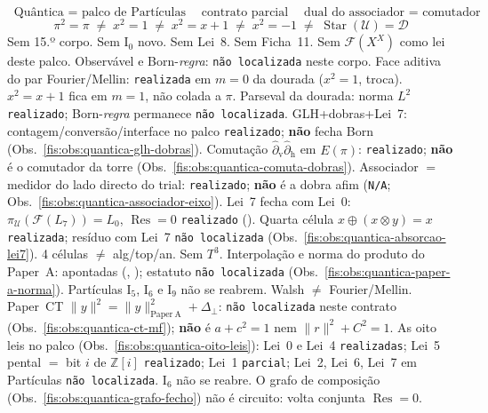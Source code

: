 \documentclass[livro.tex]{subfiles}
\begin{document}
\[
\boxed{\;
\text{Quântica $=$ palco de Partículas}
\quad
\text{contrato parcial}
\quad
\text{dual do associador $=$ comutador}
\;}
\]
\[
\boxed{\;
\pi^{2}=\pi
\;\neq\;
x^{2}=1
\;\neq\;
x^{2}=x+1
\;\neq\;
x^{2}=-1
\;\neq\;
\operatorname{Star}(\mathcal{U})=\mathcal{D}
\;}
\]
Sem 15.º corpo. Sem \(\mathrm{I}_{0}\) novo. Sem Lei~8. Sem Ficha~11.
Sem \(\mathcal{F}(X^{X})\) como lei deste palco. Observável e
Born-\emph{regra}: \texttt{não localizada} neste corpo.
Face aditiva do par Fourier/Mellin: \texttt{realizada} em
\(m=0\) da dourada (\(x^{2}=1\), troca).
\(x^{2}=x+1\) fica em \(m=1\), não colada a \(\pi\).
Parseval da dourada: norma \(L^{2}\) \texttt{realizado};
Born-\emph{regra} permanece \texttt{não localizada}.
GLH+dobras+Lei~7: contagem/conversão/interface no palco
\texttt{realizado}; \textbf{não} fecha Born
(Obs.~\ref{fis:obs:quantica-glh-dobras}).
Comutação
\(\hat\partial_{\mathrm{v}}\hat\partial_{\mathrm{h}}\)
em \(E(\pi)\): \texttt{realizado};
\textbf{não} é o comutador da torre
(Obs.~\ref{fis:obs:quantica-comuta-dobras}).
Associador $=$ medidor do lado directo
do trial: \texttt{realizado};
\textbf{não} é a dobra afim
(\texttt{N/A}; Obs.~\ref{fis:obs:quantica-associador-eixo}).
Lei~7 fecha com Lei~0:
\(\pi_{\mathcal{U}}(\mathcal{F}(L_7))=L_0\),
\(\operatorname{Res}=0\)
\texttt{realizado}
().
Quarta célula
\(x\oplus(x\otimes y)=x\)
\texttt{realizada};
resíduo com Lei~7
\texttt{não localizada}
(Obs.~\ref{fis:obs:quantica-absorcao-lei7}).
4 células \(\neq\) alg/top/an.
Sem \(T^{3}\).
Interpolação e norma do produto
do Paper~A: apontadas
(,
);
estatuto \texttt{não localizada}
(Obs.~\ref{fis:obs:quantica-paper-a-norma}).
Partículas \(\mathrm{I}_{5}\), \(\mathrm{I}_{6}\) e \(\mathrm{I}_{9}\) não se reabrem.
Walsh \(\neq\) Fourier/Mellin.
Paper~CT \(\lVert y\rVert^{2}=\lVert y\rVert^{2}_{\mathrm{Paper~A}}+\Delta_{\perp}\):
\texttt{não localizada} neste contrato
(Obs.~\ref{fis:obs:quantica-ct-mf});
\textbf{não} é \(a+c^{2}=1\) nem \(\lVert r\rVert^{2}+C^{2}=1\).
As oito leis no palco
(Obs.~\ref{fis:obs:quantica-oito-leis}):
Lei~0 e Lei~4 \texttt{realizadas};
Lei~5 pental \(=\) bit \(i\) de \(\mathbb{Z}[i]\)
\texttt{realizado};
Lei~1 \texttt{parcial};
Lei~2, Lei~6, Lei~7 em Partículas
\texttt{não localizada}.
\(\mathrm{I}_{6}\) não se reabre.
O grafo de composição
(Obs.~\ref{fis:obs:quantica-grafo-fecho})
não é circuito: volta conjunta
\(\operatorname{Res}=0\).
\end{document}
